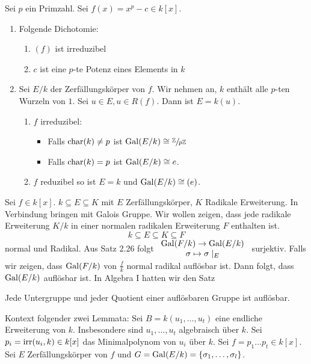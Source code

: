\begin{lemma}
	Sei $p$ ein Primzahl. Sei $f(x) = x^{p}-c \in k[x]$.
	\begin{enumerate}[(1)]
		\item Folgende Dichotomie:
			\begin{enumerate}[({1}.1)]
				\item $(f)$ ist irreduzibel
				\item $c$ ist eine $p$-te Potenz eines Elements in $k$
			\end{enumerate}
		\item Sei $E / k$ der Zerfällungskörper von $f$. Wir nehmen an, $k$ enthält alle $p$-ten Wurzeln von $1$.
			Sei $u \in E, u \in R(f)$. Dann ist $E = k(u)$.
			\begin{enumerate}[(2.1)]
				\item $f$ irreduzibel:
					\begin{itemize}
						\item Falls $\operatorname{char}(k) \neq p$ ist $\operatorname{Gal}(E / k) \cong \sfrac{\mathbb{Z}}{p \mathbb{Z}}$ 
						\item Falls $\operatorname{char}(k) = p$ ist $\operatorname{Gal}(E / k) \cong e$.
					\end{itemize}
				\item $f$ reduzibel so ist $E = k$ und $\operatorname{Gal}(E / k) \cong (e)$.
			\end{enumerate}
	\end{enumerate}
\end{lemma}



Sei $f \in k[x]$. $k \subseteq E \subseteq K$ mit $E$ Zerfällungskörper, $K$ Radikale Erweiterung. 
In Verbindung bringen mit Galois Gruppe.
Wir wollen zeigen, dass jede radikale Erweiterung $K / k$ in einer normalen radikalen Erweiterung $F$ enthalten ist.
\[
k \subseteq E \subseteq K \subseteq F
\] 
normal und Radikal. Aus Satz 2.26 folgt $\begin{array}{c} \operatorname{Gal}(F / k) \to \operatorname{Gal}( E / k)\\ \sigma \mapsto \sigma \mid_{E}\\ \end{array}$ surjektiv.
Falls wir zeigen, dass $\operatorname{Gal}(F / k)$ von $\frac{f}{k}$ normal radikal auflösbar ist.
Dann folgt, dass $\operatorname{Gal}(E / k)$ auflösbar ist.
In Algebra I hatten wir den Satz
\begin{theorem}
	Jede Untergruppe und jeder Quotient einer auflösbaren Gruppe ist auflösbar.
\end{theorem}

Kontext folgender zwei Lemmata: Sei $B = k(u_1,\ldots,u_{t})$ eine endliche Erweiterung von $k$.
Insbesondere sind $u_1,\ldots,u_{t}$ algebraisch über $k$.
Sei $p_{i} = \operatorname{irr}(u_{i},k) \in k[x]$ das Minimalpolynom von $u_{i}$ über $k$.
Sei $f = p_1 \ldots p_{t} \in k[x]$. Sei $E$ Zerfällungskörper von $f$ und $G = \operatorname{Gal}(E / k) = \{\sigma_1,\ldots,\sigma_{l}\}	$.

